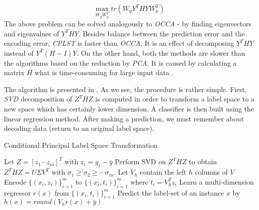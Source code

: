 \begin{equation}\label{eq:cplst6}
    \max_{W_yW_y^T} tr(W_yY^THYW_y^T)  
\end{equation}
The above problem can be solved analogously to \textit{OCCA} - by finding eigenvectors and eigenvalues of $Y^THY$. Besides balance between the prediction error and the encoding error, \textit{CPLST} is faster than \textit{OCCA}. It is an effect of decomposing $Y^THY$ instead of $Y^T(H-I)Y$. On the other hand, both the methods are slower than the algorithms based on the reduction by \textit{PCA}. It is caused by calculating a matrix $H$ what is time-consuming for large input data \cite{ChenLin}.

The algorithm is presented in  \cite{ChenLin}. As we see, the procedure is rather simple. First, \textit{SVD} decomposition of $Z^THZ$  is computed in order to transform a label space to a new space which has certainly lower dimension. A classifier is then built using the linear regression method. After making a prediction, we must remember about decoding data (return to an original label space).  

\begin{algorithm}
    \caption{Conditional Principal Label Space Transformation}\label{alg:cplst1}
    \begin{algorithmic}[1]
        \State Let $Z=[z_1 \cdots z_m]^T$ with $z_i=y_i-\bar{y}$
        \State Perform SVD on $Z^THZ$ to obtain $Z^THZ=U\Sigma V^T$ with $\sigma_{1} \geq \sigma_{2} \geq \cdots \sigma_{m}$. Let $V_h$ contain the left $h$ columns of $V$
        \State Encode $\{(x_i,z_i)\}^{m}_{i=1}$ to $\{(x_i,t_i)\}^{m}_{i=1}$ where $t_i=V^T_hz_i$
        \State Learn a multi-dimension regressor $r(x)$ from $\{(x_i,t_i)\}^{m}_{i=1}$ 
        \State Predict the label-set of an instance $x$ by $h(x)=round(V_hr(x)+\bar{y})$  
    \end{algorithmic}
\end{algorithm}


